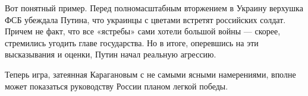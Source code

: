Вот понятный пример. Перед полномасштабным вторжением в Украину верхушка ФСБ убеждала Путина, что украинцы с цветами встретят российских солдат. Причем не факт, что все «ястребы» сами хотели большой войны — скорее, стремились угодить главе государства. Но в итоге, оперевшись на эти высказывания и оценки, Путин начал реальную агрессию.

Теперь игра, затеянная Карагановым с не самыми ясными намерениями, вполне может показаться руководству России планом легкой победы.